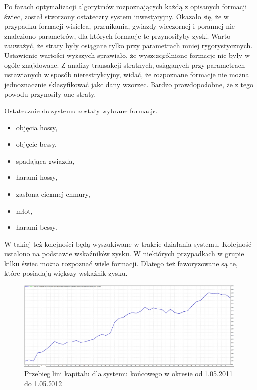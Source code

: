 \documentclass[pdflatex,11pt]{aghdpl}
\begin{document}
Po fazach optymalizacji algorytmów rozpoznających każdą z opisanych formacji świec, został stworzony ostateczny system inwestycyjny. Okazało się, że w przypadku formacji wisielca, przenikania, gwiazdy wieczornej i porannej nie znaleziono parametrów, dla których formacje te przynosiłyby zyski. Warto zauważyć, że straty były osiągane tylko przy parametrach mniej rygorystycznych. Ustawienie wartości wyższych sprawiało, że wyszczególnione formacje nie były w ogóle znajdowane. Z analizy transakcji stratnych, osiąganych przy parametrach ustawianych w sposób nierestrykcyjny, widać, że rozpoznane formacje nie można jednoznacznie sklasyfikować jako dany wzorzec. Bardzo prawdopodobne, że z tego powodu przynosiły one straty.

Ostatecznie do systemu zostały wybrane formacje:
\begin{itemize}
\item objęcia hossy,
\item objęcie bessy,
\item spadająca gwiazda,
\item harami hossy,
\item zasłona ciemnej chmury,
\item młot,
\item harami bessy.
\end{itemize}
W takiej też kolejności będą wyszukiwane w trakcie działania systemu. Kolejność ustalono na podstawie wskaźników zysku. W niektórych przypadkach w grupie kilku świec można rozpoznać wiele formacji. Dlatego też faworyzowane są te, które posiadają większy wskaźnik zysku.
\begin{figure}[h!]
\begin{center}
\includegraphics[width=16cm]{wszystkie/linia_kap.png}
\caption{Przebieg lini kapitału dla systemu końcowego w okresie od 1.05.2011 do 1.05.2012}
\label{system_linia_kap}
\end{center}
\end{figure}
\end{document}

